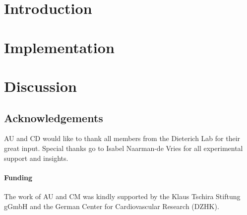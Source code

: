 \documentclass{bioinfo}
\begin{document}
\section*{Introduction}

\section*{Implementation}

\vspace*{-.5cm}
\section*{Discussion}

 \vspace*{-.3cm}
\subsection*{Acknowledgements}
AU and CD would like to thank all members from the Dieterich Lab for their great input.
Special thanks go to Isabel Naarman-de Vries for all experimental support and insights.
\paragraph{Funding\textcolon} 
The work of AU and CM was kindly supported 
by the Klaus Tschira Stiftung gGmbH and the German Center for Cardiovascular Research (DZHK).
\vspace*{-0.6cm}

%
%
%
%
%
%
%

\end{document}
